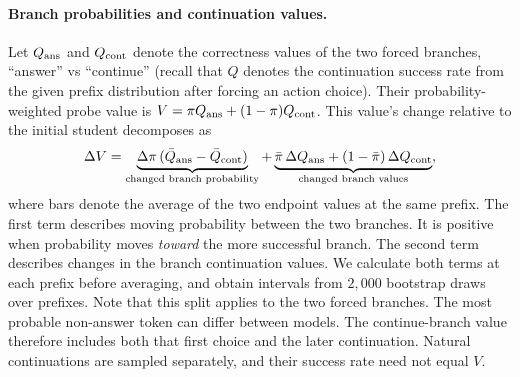 \paragraph{Branch probabilities and continuation values.}
Let $Q_{\rm ans}$ and $Q_{\rm cont}$ denote the correctness values of the two forced branches, ``answer'' vs ``continue'' (recall that $Q$ denotes the continuation success rate from the given prefix distribution after forcing an action choice). Their probability-weighted probe value is $V=\pi Q_{\rm ans}+(1-\pi)Q_{\rm cont}$. This value's change relative to the initial student decomposes as
\[
\Delta V=
\underbrace{\Delta\pi\,(\bar Q_{\rm ans}-\bar Q_{\rm cont})}_{\text{changed branch probability}}
+\underbrace{\bar\pi\,\Delta Q_{\rm ans}+(1-\bar\pi)\,\Delta Q_{\rm cont}}_{\text{changed branch values}},
\]
where bars denote the average of the two endpoint values at the same prefix. The first term describes moving probability between the two branches. It is positive when probability moves \emph{toward} the more successful branch. The second term describes changes in the branch continuation values. We calculate both terms at each prefix before averaging, and obtain intervals from $2{,}000$ bootstrap draws over prefixes. Note that this split applies to the two forced branches. The most probable non-answer token can differ between models. The continue-branch value therefore includes both that first choice and the later continuation. Natural continuations are sampled separately, and their success rate need not equal $V$.

